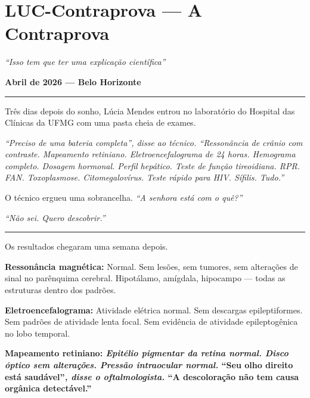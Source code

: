 \section*{\textbf{LUC-Contraprova} --- A Contraprova}

\noindent \textit{\textquotedblleft{}Isso tem que ter uma explicação científica\textquotedblright{}}

\noindent \textbf{Abril de 2026 --- Belo Horizonte}

\vspace{0.5em}\noindent\rule{\textwidth}{0.5pt}\vspace{0.5em}

\noindent Três dias depois do sonho, Lúcia Mendes entrou no laboratório do Hospital das Clínicas da UFMG com uma pasta cheia de exames.

\noindent \textit{\textquotedblleft{}Preciso de uma bateria completa\textquotedblright{}\textit{, disse ao técnico. }\textquotedblleft{}Ressonância de crânio com contraste. Mapeamento retiniano. Eletroencefalograma de 24 horas. Hemograma completo. Dosagem hormonal. Perfil hepático. Teste de função tireoidiana. RPR. FAN. Toxoplasmose. Citomegalovírus. Teste rápido para HIV. Sífilis. Tudo.\textquotedblright{}}

\noindent O técnico ergueu uma sobrancelha. \textit{\textquotedblleft{}A senhora está com o quê?\textquotedblright{}}

\noindent \textit{\textquotedblleft{}Não sei. Quero descobrir.\textquotedblright{}}

\vspace{0.5em}\noindent\rule{\textwidth}{0.5pt}\vspace{0.5em}

\noindent Os resultados chegaram uma semana depois.

\noindent \textbf{Ressonância magnética:} Normal. Sem lesões, sem tumores, sem alterações de sinal no parênquima cerebral. Hipotálamo, amígdala, hipocampo --- todas as estruturas dentro dos padrões.

\noindent \textbf{Eletroencefalograma:} Atividade elétrica normal. Sem descargas epileptiformes. Sem padrões de atividade lenta focal. Sem evidência de atividade epileptogênica no lobo temporal.

\noindent \textbf{Mapeamento retiniano:\textit{ Epitélio pigmentar da retina normal. Disco óptico sem alterações. Pressão intraocular normal. }\textquotedblleft{}Seu olho direito está saudável\textquotedblright{}\textit{, disse o oftalmologista. }\textquotedblleft{}A descoloração não tem causa orgânica detectável.\textquotedblright{}}


